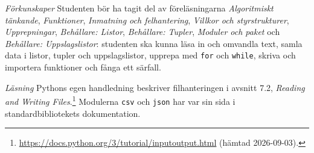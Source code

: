 \emph{Förkunskaper}
Studenten bör ha tagit del av föreläsningarna \emph{Algoritmiskt
tänkande}, \emph{Funktioner}, \emph{Inmatning och felhantering},
\emph{Villkor och styrstrukturer}, \emph{Upprepningar},
\emph{Behållare: Listor}, \emph{Behållare: Tupler}, \emph{Moduler och
paket} och \emph{Behållare: Uppslagslistor}: studenten ska kunna läsa
in och omvandla text, samla data i listor, tupler och uppslagslistor,
upprepa med \texttt{for} och \texttt{while},
skriva och importera funktioner och fånga ett särfall.

\emph{Läsning}
Pythons egen handledning beskriver filhanteringen i avsnitt 7.2,
\emph{Reading and Writing Files}.\footnote{\label{fn:pydoc-files}%
  \url{https://docs.python.org/3/tutorial/inputoutput.html}
  (hämtad 2026-09-03).}
Modulerna \texttt{csv} och \texttt{json} har var
sin sida i standardbibliotekets dokumentation.
